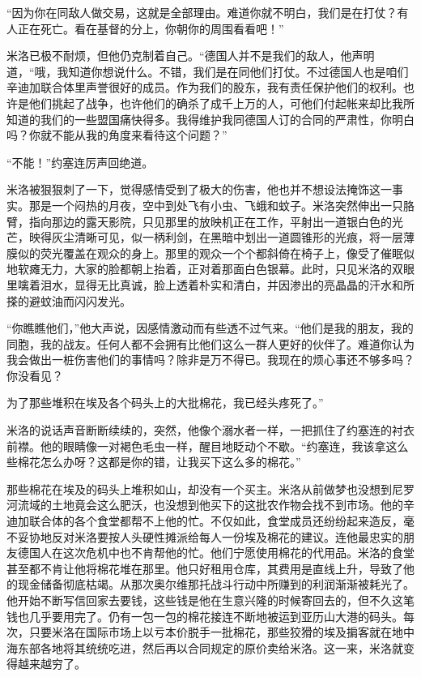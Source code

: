     “因为你在同敌人做交易，这就是全部理由。难道你就不明白，我们是在打仗？有人正在死亡。看在基督的分上，你朝你的周围看看吧！”
 


    米洛已极不耐烦，但他仍克制着自己。“德国人并不是我们的敌人，他声明道，“哦，我知道你想说什么。不错，我们是在同他们打仗。不过德国人也是咱们辛迪加联合体里声誉很好的成员。作为我们的股东，我有责任保护他们的权利。也许是他们挑起了战争，也许他们的确杀了成千上万的人，可他们付起帐来却比我所知道的我们的一些盟国痛快得多。我得维护我同德国人订的合同的严肃性，你明白吗？你就不能从我的角度来看待这个问题？”

    “不能！”约塞连厉声回绝道。

    米洛被狠狠刺了一下，觉得感情受到了极大的伤害，他也并不想设法掩饰这一事实。那是一个闷热的月夜，空中到处飞有小虫、飞蛾和蚊子。米洛突然伸出一只胳臂，指向那边的露天影院，只见那里的放映机正在工作，平射出一道银白色的光芒，映得灰尘清晰可见，似一柄利剑，在黑暗中划出一道圆锥形的光痕，将一层薄膜似的荧光覆盖在观众的身上。那里的观众一个个都斜倚在椅子上，像受了催眠似地软瘫无力，大家的脸都朝上抬着，正对着那面白色银幕。此时，只见米洛的双眼里噙着泪水，显得无比真诚，脸上透着朴实和清白，并因渗出的亮晶晶的汗水和所搽的避蚊油而闪闪发光。

    “你瞧瞧他们，”他大声说，因感情激动而有些透不过气来。“他们是我的朋友，我的同胞，我的战友。任何人都不会拥有比他们这么一群人更好的伙伴了。难道你认为我会做出一桩伤害他们的事情吗？除非是万不得已。我现在的烦心事还不够多吗？你没看见？

    为了那些堆积在埃及各个码头上的大批棉花，我已经头疼死了。”

    米洛的说话声音断断续续的，突然，他像个溺水者一样，一把抓住了约塞连的衬衣前襟。他的眼睛像一对褐色毛虫一样，醒目地眨动个不歇。“约塞连，我该拿这么些棉花怎么办呀？这都是你的错，让我买下这么多的棉花。”

    那些棉花在埃及的码头上堆积如山，却没有一个买主。米洛从前做梦也没想到尼罗河流域的土地竟会这么肥沃，也没想到他买下的这批农作物会找不到市场。他的辛迪加联合体的各个食堂都帮不上他的忙。不仅如此，食堂成员还纷纷起来造反，毫不妥协地反对米洛要按人头硬性摊派给每人一份埃及棉花的建议。连他最忠实的朋友德国人在这次危机中也不肯帮他的忙。他们宁愿使用棉花的代用品。米洛的食堂甚至都不肯让他将棉花堆在那里。他只好租用仓库，其费用是直线上升，导致了他的现金储备彻底枯竭。从那次奥尔维那托战斗行动中所赚到的利润渐渐被耗光了。他开始不断写信回家去要钱，这些钱是他在生意兴隆的时候寄回去的，但不久这笔钱也几乎要用完了。仍有一包一包的棉花接连不断地被运到亚历山大港的码头。每次，只要米洛在国际市场上以亏本价脱手一批棉花，那些狡猾的埃及掮客就在地中海东部各地将其统统吃进，然后再以合同规定的原价卖给米洛。这一来，米洛就变得越来越穷了。
 


